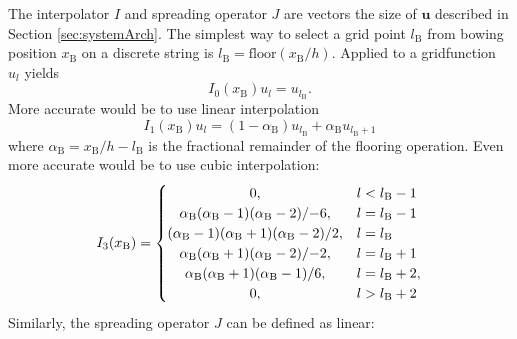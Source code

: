 \documentclass[twoside,a4paper,dvipsnames]{article}
\begin{document}
The interpolator $I$ and spreading operator $J$ are vectors the size of $\mathbf{u}$ described in Section \ref{sec:systemArch}. The simplest way to select a grid point $l_\text{B}$ from bowing position $x_\text{B}$ on a discrete string is $l_\text{B} = \text{floor}(x_\text{B}/h)$. Applied to a gridfunction $u_l$ yields
\begin{equation}
    I_0(x_\text{B})u_l = u_{l_\text{B}}.
\end{equation}
More accurate would be to use linear interpolation 
\begin{equation}\label{eq:linearInterpolation}
     I_1(x_\text{B})u_l =
      (1-\alpha_\text{B})u_{l_\text{B}}+ \alpha_\text{B}u_{l_\text{B}+1}
\end{equation}
where $\alpha_\text{B} = x_\text{B}/h - l_\text{B}$ is the fractional remainder of the flooring operation. Even more accurate would be to use cubic interpolation:
\begin{equation}
I_3(x_\text{B}) =
     \begin{cases}
    \hfil 0, & l < l_{\text{B}} - 1\\
    \hfil \alpha_\text{B}(\alpha_\text{B}-1)(\alpha_\text{B} - 2)/{-6}, & l = l_{\text{B}} - 1\\
    \hfil (\alpha_\text{B}-1)(\alpha_\text{B}+1)(\alpha_\text{B}-2)/2, & l = l_{\text{B}}\\
    \hfil \alpha_\text{B}(\alpha_\text{B}+1)(\alpha_\text{B} - 2)/{-2}, & l = l_{\text{B}} + 1\\
    \hfil \alpha_\text{B}(\alpha_\text{B}+1)(\alpha_\text{B} - 1)/6, & l = l_{\text{B}} +2,\\
    \hfil 0, & l > l_\text{B} + 2
    \end{cases}
    \end{equation}
Similarly, the spreading operator $J$ can be defined as linear:
\end{document}
